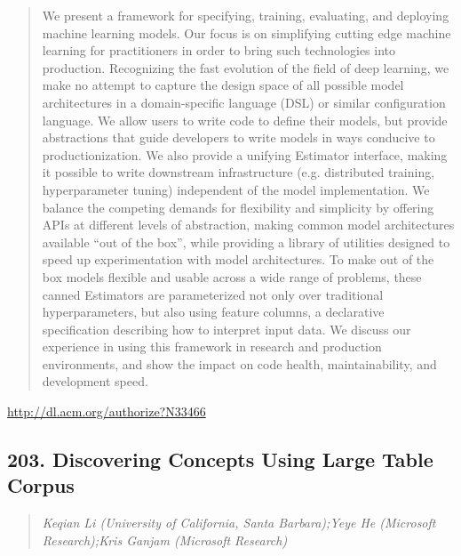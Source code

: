 \documentclass{article}
\begin{document}
\begin{quote}
We present a framework for specifying, training, evaluating, and deploying machine learning models. Our focus is on simplifying cutting edge machine learning for practitioners in order to bring such technologies into production. Recognizing the fast evolution of the field of deep learning, we make no attempt to capture the design space of all possible model architectures in a domain-specific language (DSL) or similar configuration language. We allow users to write code to define their models, but provide abstractions that guide developers to write models in ways conducive to productionization. We also provide a unifying Estimator interface, making it possible to write downstream infrastructure (e.g. distributed training, hyperparameter tuning) independent of the model implementation. We balance the competing demands for flexibility and simplicity by offering APIs at different levels of abstraction, making common model architectures available “out of the box”, while providing a library of utilities designed to speed up experimentation with model architectures. To make out of the box models flexible and usable across a wide range of problems, these canned Estimators are parameterized not only over traditional hyperparameters, but also using feature columns, a declarative specification describing how to interpret input data. We discuss our experience in using this framework in research and production environments, and show the impact on code health, maintainability, and development speed.
\end{quote}

\href{http://dl.acm.org/authorize?N33466}{http://dl.acm.org/authorize?N33466}

\subsection{203. Discovering Concepts Using Large Table Corpus}

\begin{quote}
\footnotesize{\textit{Keqian Li (University of California, Santa Barbara);Yeye He (Microsoft Research);Kris Ganjam (Microsoft Research)}}

\end{quote}
\end{document}
